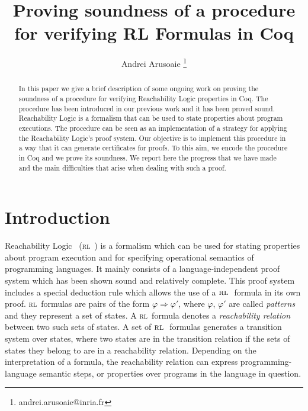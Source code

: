 \documentclass[10pt,a4wide]{article}
\title{Proving soundness of a procedure for verifying RL Formulas in Coq}
\author{Andrei Arusoaie
\thanks{andrei.arusoaie@inria.fr}}
\affil{INRIA Lille-Nord Europe}
\date{}                                           %
\newcommand{\Ra}{\Rightarrow}
\newcommand{\rrule}[2]{{#1} \Ra{#2}}
\newcommand{\RL}{\textsc{rl}~}
\begin{document}
\maketitle

\begin{abstract}
In this paper we give a brief description of some ongoing work on proving the soundness of a procedure for verifying Reachability Logic properties in Coq. 
The procedure has been introduced in our previous work and it has been proved sound.
Reachability Logic is a formalism that can be used to state properties about program executions.
The procedure can be seen as an implementation of a strategy for applying the Reachability Logic's proof system.
Our objective is to implement this procedure in a way that it can generate certificates for proofs.
To this aim, we encode the procedure in Coq and we prove its soundness.
We report here the progress that we have made and the main difficulties that arise when dealing with such a proof.
\end{abstract}

\section{Introduction}

Reachability Logic~\cite{rosu-stefanescu-ciobaca-moore-2013-lics,rosu-stefanescu-2012-oopsla,rosu-stefanescu-2012-fm,stefanescu-ciobaca-mereuta-moore-serbanuta-rosu-2014-rta}  (\RL) is a formalism which can be used for stating properties about program execution and for specifying operational semantics of programming languages. 
It mainly consists of a language-independent proof system which has been shown sound and relatively complete. 
This proof system includes a special deduction rule which allows the use of a $\RL$ formula in its own proof.
\RL formulas are pairs of the form $\rrule{\varphi}{\varphi'}$, where $\varphi$, $\varphi'$ are called \emph{patterns} and they represent a set of states. 
A \RL formula denotes a \emph{reachability relation} between two such sets of states. 
A set of $\RL$ formulas generates a transition system over states, where two states are in the transition relation if the sets of states they belong to are in a reachability relation.
Depending on the interpretation of a formula, the reachability relation can express programming-language semantic steps, or properties over programs in the language in question. 
\end{document}

